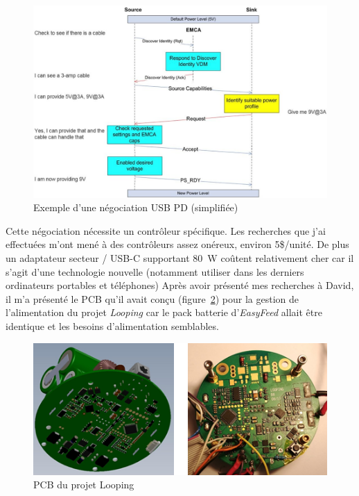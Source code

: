 \documentclass[a4paper, 12pt, sffamily]{report}
\begin{document}
\begin{figure}[H]
\centering
\includegraphics[scale=0.35]{figures/screenshots/usb_pd_nego.png}
\caption{Exemple d’une négociation USB PD (simplifiée) \cite{usb_pd_nego}}
\label{fig:usb_pd_negociation}
\end{figure}

Cette négociation nécessite un contrôleur spécifique. Les recherches que j’ai effectuées m’ont mené à des contrôleurs assez onéreux, environ 5\$/unité. De plus un adaptateur secteur / USB-C supportant \SI{80}{\watt} coûtent relativement cher car il s'agit d'une technologie nouvelle (notamment utiliser dans les derniers ordinateurs portables et téléphones)
Après avoir présenté mes recherches à David, il m'a présenté le PCB qu’il avait conçu (figure~\ref{fig:looping_pcb}) pour la gestion de l’alimentation du projet \emph{Looping} car le pack batterie d'\emph{EasyFeed} allait être identique et les besoins d'alimentation semblables.

\begin{figure}[H]
\centering
\includegraphics[scale=1]{figures/photos/looping_pcb.jpg}
\caption{PCB du projet Looping}
\label{fig:looping_pcb}
\end{figure}
\end{document}
